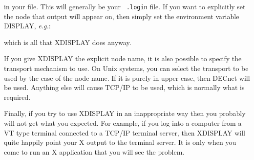 \documentclass[twoside,11pt,nolof,noabs]{starlink}
\begin{document}
in your file. This will generally be your \texttt{ .login} file. If you want to
explicitly set the node that output will appear on, then simply set the
environment variable DISPLAY, \emph{e.g.}:

\begin{terminalv}
\end{terminalv}

which is all that XDISPLAY does anyway.

If you give XDISPLAY the explicit node name, it is also possible to
specify the transport mechanism to use.  On Unix systems, you can
select the transport to be used by the case of the node name.  If it is
purely in upper case, then DECnet will be used.  Anything else will
cause TCP/IP to be used, which is normally what is required.

Finally, if you try to use XDISPLAY in an inappropriate way then you
probably will not get what you expected.  For example, if you log into a
computer from a VT type terminal connected to a TCP/IP terminal server,
then XDISPLAY will quite happily point your X output to the terminal
server. It is only when you come to run an X application that you will
see the problem.
\end{document}
